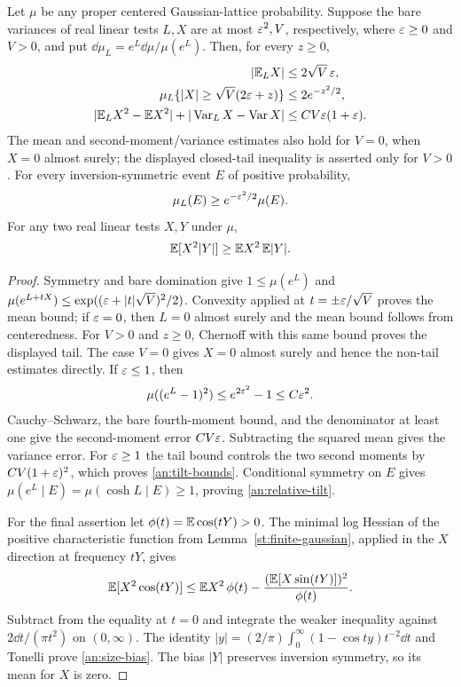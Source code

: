 \begin{lemma}
Let $\mu$ be any proper centered Gaussian-lattice probability.\label{an:tilt}
Suppose the bare variances of real linear tests $L,X$ are at most
$\varepsilon^2,V$, respectively, where $\varepsilon\ge0$ and $V>0$, and put
$\dd\mu_L=e^L\dd\mu/\mu(e^L)$.  Then, for every $z\ge0$,
\begin{align}
 |\mathbb E_LX|&\le2\sqrt V\,\varepsilon,\\
 \mu_L\{|X|\ge\sqrt V(2\varepsilon+z)\}&\le2e^{-z^2/2},\\
 |\mathbb E_LX^2-\mathbb E X^2|+|\operatorname{Var}_LX-\operatorname{Var} X|
       &\le CV\varepsilon(1+\varepsilon).
 \label{an:tilt-bounds}
\end{align}
The mean and second-moment/variance estimates also hold for $V=0$,
when $X=0$ almost surely; the displayed closed-tail inequality is
asserted only for $V>0$.
For every inversion-symmetric event $E$ of positive probability,
\begin{equation}
 \mu_L(E)\ge e^{-\varepsilon^2/2}\mu(E).
 \label{an:relative-tilt}
\end{equation}
For any two real linear tests $X,Y$ under $\mu$,
\begin{equation}
 \mathbb E[X^2|Y|]\ge\mathbb E X^2\,\mathbb E|Y|.
 \label{an:size-bias}
\end{equation}
\end{lemma}

\begin{proof}
Symmetry and bare domination give $1\le\mu(e^L)$ and
$\mu(e^{L+tX})\le\exp((\varepsilon+|t|\sqrt V)^2/2)$.
Convexity applied at $t=\pm\varepsilon/\sqrt V$ proves the mean bound;
if $\varepsilon=0$, then $L=0$ almost surely and the mean bound follows
from centeredness.  For $V>0$ and $z\ge0$, Chernoff with this same
bound proves the displayed tail.  The case $V=0$ gives $X=0$
almost surely and hence the non-tail estimates directly.
If $\varepsilon\le1$, then
\[
 \mu((e^L-1)^2)\le e^{2\varepsilon^2}-1\le C\varepsilon^2.
\]
Cauchy--Schwarz, the bare fourth-moment bound, and the denominator
at least one give the second-moment error $CV\varepsilon$.  Subtracting
the squared mean gives the variance error.  For $\varepsilon\ge1$ the
tail bound controls the two second moments by $CV(1+\varepsilon)^2$,
which proves \eqref{an:tilt-bounds}.  Conditional symmetry on $E$
gives $\mu(e^L\mid E)=\mu(\cosh L\mid E)\ge1$, proving
\eqref{an:relative-tilt}.

For the final assertion let $\phi(t)=\mathbb E\cos(tY)>0$.
The minimal log Hessian of the positive characteristic function
from Lemma~\ref{st:finite-gaussian}, applied in the $X$ direction
at frequency $tY$, gives
\[
 \mathbb E[X^2\cos(tY)]\le \mathbb E X^2\,\phi(t)
                    -\frac{(\mathbb E[X\sin(tY)])^2}{\phi(t)}.
\]
Subtract from the equality at $t=0$ and integrate the weaker
inequality against $2\dd t/(\pi t^2)$ on $(0,\infty)$.
The identity $|y|=(2/\pi)\int_0^\infty(1-\cos ty)t^{-2}\dd t$
and Tonelli prove \eqref{an:size-bias}.  The bias $|Y|$ preserves
inversion symmetry, so its mean for $X$ is zero.
\end{proof}

